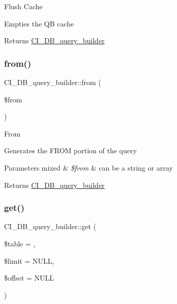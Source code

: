 Flush Cache

Empties the QB cache

\begin{DoxyReturn}{Returns}
\mbox{\hyperlink{class_c_i___d_b__query__builder}{C\+I\+\_\+\+D\+B\+\_\+query\+\_\+builder}} 
\end{DoxyReturn}
\mbox{\label{class_c_i___d_b__query__builder_a69d7cedff660dbe0dedbef5562eacefb}} 
\subsubsection{\texorpdfstring{from()}{from()}}
{\footnotesize\ttfamily C\+I\+\_\+\+D\+B\+\_\+query\+\_\+builder\+::from (\begin{DoxyParamCaption}\item[{}]{\$from }\end{DoxyParamCaption})}

From

Generates the F\+R\+OM portion of the query


\begin{DoxyParams}[1]{Parameters}
mixed & {\em \$from} & can be a string or array \\
\hline
\end{DoxyParams}
\begin{DoxyReturn}{Returns}
\mbox{\hyperlink{class_c_i___d_b__query__builder}{C\+I\+\_\+\+D\+B\+\_\+query\+\_\+builder}} 
\end{DoxyReturn}
\mbox{\label{class_c_i___d_b__query__builder_a2e2e9087b1d03de3f39b4167f85e7721}} 
\subsubsection{\texorpdfstring{get()}{get()}}
{\footnotesize\ttfamily C\+I\+\_\+\+D\+B\+\_\+query\+\_\+builder\+::get (\begin{DoxyParamCaption}\item[{}]{\$table = {\ttfamily \textquotesingle{}\textquotesingle{}},  }\item[{}]{\$limit = {\ttfamily NULL},  }\item[{}]{\$offset = {\ttfamily NULL} }\end{DoxyParamCaption})}

